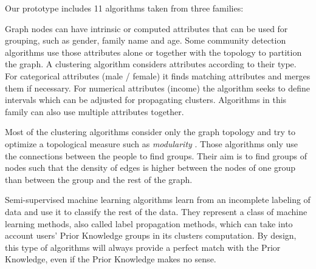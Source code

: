 Our prototype includes 11 algorithms taken from three families:
\begin{description}[leftmargin=0pt,nosep]
\item[Attribute based algorithms.] Graph nodes can have intrinsic or computed attributes that can be used for grouping, such as gender, family name and age. Some community detection algorithms use those attributes alone or together with the topology to partition the graph.
A clustering algorithm considers attributes according to their type. For categorical attributes (\eg male / female) it finds matching attributes and merges them if necessary. For numerical attributes (\eg income) the algorithm seeks to define intervals which can be adjusted for propagating clusters.
Algorithms in this family can also use multiple attributes together.

\item[Topology based algorithms.] Most of the clustering algorithms consider only the graph topology \cite{baroni17} and try to optimize a topological measure such as \emph{modularity} \cite{brandes08}.
Those algorithms only use the connections between the people to find groups. Their aim is to find groups of nodes such that the density of edges is higher between the nodes of one group than between the group and the rest of the graph.

\item[Propagation / Learning based algorithms.] Semi-supervised machine learning algorithms learn from an incomplete labeling of data and use it to classify the rest of the data. They represent a class of machine learning methods, also called label propagation methods, which can take into account users' Prior Knowledge groups in its clusters computation.
By design, this type of algorithms will always provide a perfect match with the Prior Knowledge, even if the Prior Knowledge makes no sense.

\end{description}


